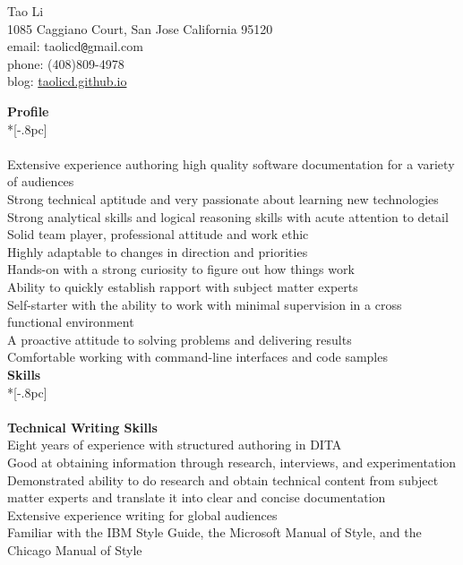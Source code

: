 \documentclass[11pt]{extarticle}
\begin{document}
\begin{center}
{\Large Tao Li} \\[0.2pc]
1085 Caggiano Court, San Jose California  95120 \\
email: taolicd\verb|@|gmail.com \\
phone: (408)809-4978     \\
blog: \url{taolicd.github.io} \\ 

\end{center}

{\large \bf Profile} \\*[-.8pc]
\underline{\hspace{6.55in}} \\
\\
Extensive experience authoring high quality software documentation for a variety of audiences  \\
Strong technical aptitude and very passionate about learning new technologies\\
Strong analytical skills and logical reasoning skills with acute attention to detail\\
Solid team player, professional attitude and work ethic\\
Highly adaptable to changes in direction and priorities\\
Hands-on with a strong curiosity  to figure out how things work\\
Ability to quickly establish rapport with subject matter experts\\
Self-starter with the ability to work with minimal supervision in a cross functional environment\\
A proactive attitude to solving problems and delivering results\\
Comfortable working with command-line interfaces and code samples\\



{\large \bf Skills} \\*[-.8pc]
\underline{\hspace{6.55in}} \\
\\
{\bf Technical Writing Skills} \\
Eight years of experience with structured authoring in DITA\\
Good at obtaining information through research, interviews, and experimentation\\
Demonstrated ability to do research and obtain technical content from subject matter experts and translate it into clear and concise documentation\\
 Extensive experience writing for global audiences\\
 Familiar with the IBM Style Guide, the Microsoft Manual of Style, and the Chicago Manual of Style\\
\end{document}
